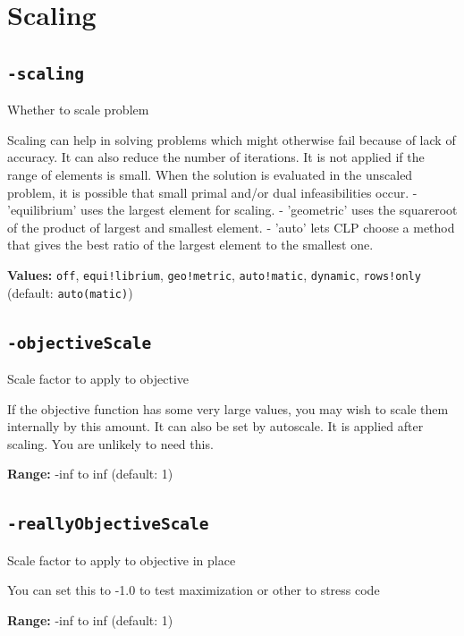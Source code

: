 \documentclass[11pt,a4paper]{article}
\begin{document}
\section{Scaling}

\subsection*{\texttt{-scaling}}

Whether to scale problem

Scaling can help in solving problems which might otherwise fail because of lack of accuracy.  It can also reduce the number of iterations. It is not applied if the range of elements is small.  When the solution is evaluated in the unscaled problem, it is possible that small primal and/or dual infeasibilities occur. 
 - 'equilibrium' uses the largest element for scaling. 
 - 'geometric' uses the squareroot of the product of largest and smallest element.
 - 'auto' lets CLP choose a method that gives the best ratio of the largest element to the smallest one.

\textbf{Values:} \texttt{off}, \texttt{equi!librium}, \texttt{geo!metric}, \texttt{auto!matic}, \texttt{dynamic}, \texttt{rows!only} (default: \texttt{auto(matic)})

\subsection*{\texttt{-objectiveScale}}

Scale factor to apply to objective

If the objective function has some very large values, you may wish to scale them internally by this amount.  It can also be set by autoscale. It is applied after scaling.  You are unlikely to need this.

\textbf{Range:} -inf to inf (default: 1)

\subsection*{\texttt{-reallyObjectiveScale}}

Scale factor to apply to objective in place

You can set this to -1.0 to test maximization or other to stress code

\textbf{Range:} -inf to inf (default: 1)
\end{document}

